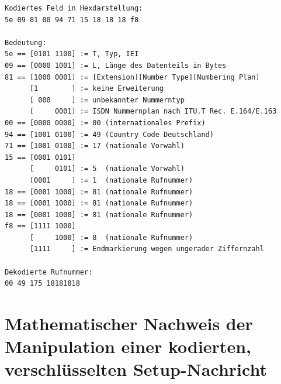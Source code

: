 \begin{lstlisting}[caption={[Dekodierung und Inhalt des Called Party Number Feldes an einem Beispiel]Dekodierung und Inhalt des Called Party Number Feldes an einem Beispiel, Daten des Feldes entnommen aus Wireshark Mitschnitt, siehe \autoref{lst:mitm_attack_wireshark}}, captionpos=b, label={lst:called_number}, language=bytetxt, numbers=none, frame=single]
Kodiertes Feld in Hexdarstellung:
5e 09 81 00 94 71 15 18 18 18 f8

Bedeutung:
5e == [0101 1100] := T, Typ, IEI
09 == [0000 1001] := L, Länge des Datenteils in Bytes
81 == [1000 0001] := [Extension][Number Type][Numbering Plan]
      [1        ] := keine Erweiterung
      [ 000     ] := unbekannter Nummerntyp
      [     0001] := ISDN Nummernplan nach ITU.T Rec. E.164/E.163
00 == [0000 0000] := 00 (internationales Prefix)	  
94 == [1001 0100] := 49 (Country Code Deutschland)
71 == [1001 0100] := 17 (nationale Vorwahl)
15 == [0001 0101]
      [     0101] := 5  (nationale Vorwahl)
      [0001     ] := 1  (nationale Rufnummer)
18 == [0001 1000] := 81 (nationale Rufnummer)
18 == [0001 1000] := 81 (nationale Rufnummer)
18 == [0001 1000] := 81 (nationale Rufnummer)
f8 == [1111 1000]
      [     1000] := 8  (nationale Rufnummer)
      [1111     ] := Endmarkierung wegen ungerader Ziffernzahl
      
Dekodierte Rufnummer:
00 49 175 18181818
\end{lstlisting}

\section{Mathematischer Nachweis der Manipulation einer kodierten, verschlüsselten Setup-Nachricht}

